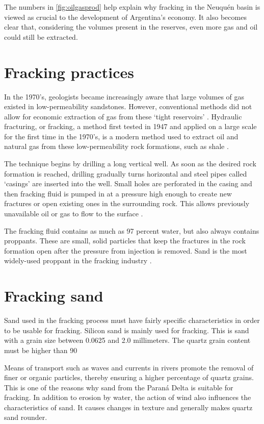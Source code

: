 The numbers in \ref{fig:oilgasprod} help explain why fracking in the Neuquén basin is viewed as crucial to the development of Argentina's economy. It also becomes clear that, considering the volumes present in the reserves, even more gas and oil could still be extracted.

\section{Fracking practices}
In the 1970's, geologists became increasingly aware that large volumes of gas existed in low-permeability sandstones. However, conventional methods did not allow for economic extraction of gas from these `tight reservoirs' \autocite{tigh}. Hydraulic fracturing, or fracking, a method first tested in 1947 and applied on a large scale for the first time in the 1970's, is a modern method used to extract oil and natural gas from these low-permeability rock formations, such as shale \autocite{Fracking1012019}.

The technique begins by drilling a long vertical well. As soon as the desired rock formation is reached, drilling gradually turns horizontal and steel pipes called `casings' are inserted into the well. Small holes are perforated in the casing and then fracking fluid is pumped in at a pressure high enough to create new fractures or open existing ones in the surrounding rock. This allows previously unavailable oil or gas to flow to the surface \autocite{Fracking1012019}.

The fracking fluid contains as much as 97 percent water, but also always contains proppants. These are small, solid particles that keep the fractures in the rock formation open after the pressure from injection is removed. Sand is the most widely-used proppant in the fracking industry \autocite{Fracking1012019}.

\section{Fracking sand}
Sand used in the fracking process must have fairly specific characteristics in order to be usable for fracking. Silicon sand is mainly used for fracking. This is sand with a grain size between 0.0625 and 2.0 millimeters. The quartz grain content must be higher than 90%

Means of transport such as waves and currents in rivers promote the removal of finer or organic particles, thereby ensuring a higher percentage of quartz grains. This is one of the reasons why sand from the Paraná Delta is suitable for fracking.
In addition to erosion by water, the action of wind also influences the characteristics of sand. It causes changes in texture and generally makes quartz sand rounder. 

